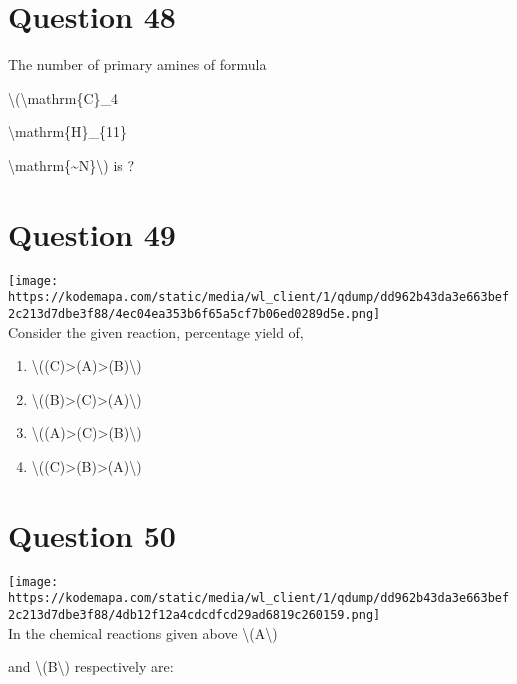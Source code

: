 \documentclass{article}
\begin{document}
\section*{Question 48}
The number of primary amines of formula

\textbackslash(\textbackslash mathrm\{C\}\_4

\textbackslash mathrm\{H\}\_\{11\}

\textbackslash mathrm\{\textasciitilde N\}\textbackslash) is ?


\begin{enumerate}[label=(\alph*)]
\end{enumerate}
\newpage
\section*{Question 49}
\texttt{[image: https://kodemapa.com/static/media/wl\_client/1/qdump/dd962b43da3e663bef2c213d7dbe3f88/4ec04ea353b6f65a5cf7b06ed0289d5e.png]}\\



Consider the given reaction, percentage yield of,~


\begin{enumerate}[label=(\alph*)]
\item \textbackslash((C)\textgreater(A)\textgreater(B)\textbackslash)


\item \textbackslash((B)\textgreater(C)\textgreater(A)\textbackslash)


\item \textbackslash((A)\textgreater(C)\textgreater(B)\textbackslash)


\item \textbackslash((C)\textgreater(B)\textgreater(A)\textbackslash)


\end{enumerate}
\newpage
\section*{Question 50}
\texttt{[image: https://kodemapa.com/static/media/wl\_client/1/qdump/dd962b43da3e663bef2c213d7dbe3f88/4db12f12a4cdcdfcd29ad6819c260159.png]}\\



In the chemical reactions given above \textbackslash(A\textbackslash)

and \textbackslash(B\textbackslash) respectively are:
\end{document}
